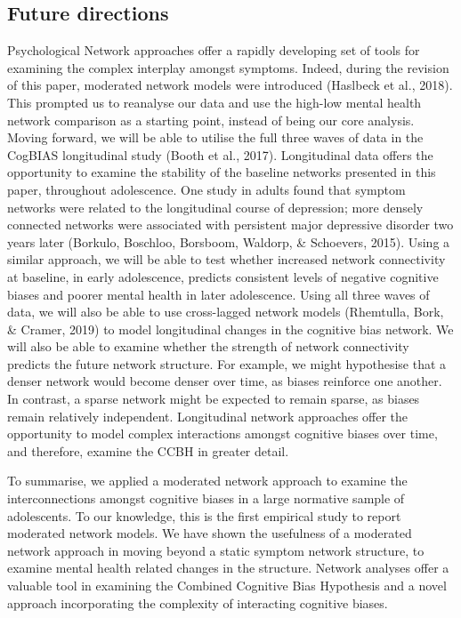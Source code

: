 \documentclass[man,floatsintext]{apa6}
\begin{document}
\hypertarget{future-directions}{%
\subsection{Future directions}\label{future-directions}}

Psychological Network approaches offer a rapidly developing set of tools for examining the complex interplay amongst symptoms. Indeed, during the revision of this paper, moderated network models were introduced (Haslbeck et al., 2018). This prompted us to reanalyse our data and use the high-low mental health network comparison as a starting point, instead of being our core analysis. Moving forward, we will be able to utilise the full three waves of data in the CogBIAS longitudinal study (Booth et al., 2017). Longitudinal data offers the opportunity to examine the stability of the baseline networks presented in this paper, throughout adolescence. One study in adults found that symptom networks were related to the longitudinal course of depression; more densely connected networks were associated with persistent major depressive disorder two years later (Borkulo, Boschloo, Borsboom, Waldorp, \& Schoevers, 2015). Using a similar approach, we will be able to test whether increased network connectivity at baseline, in early adolescence, predicts consistent levels of negative cognitive biases and poorer mental health in later adolescence. Using all three waves of data, we will also be able to use cross-lagged network models (Rhemtulla, Bork, \& Cramer, 2019) to model longitudinal changes in the cognitive bias network. We will also be able to examine whether the strength of network connectivity predicts the future network structure. For example, we might hypothesise that a denser network would become denser over time, as biases reinforce one another. In contrast, a sparse network might be expected to remain sparse, as biases remain relatively independent. Longitudinal network approaches offer the opportunity to model complex interactions amongst cognitive biases over time, and therefore, examine the CCBH in greater detail.

To summarise, we applied a moderated network approach to examine the interconnections amongst cognitive biases in a large normative sample of adolescents. To our knowledge, this is the first empirical study to report moderated network models. We have shown the usefulness of a moderated network approach in moving beyond a static symptom network structure, to examine mental health related changes in the structure. Network analyses offer a valuable tool in examining the Combined Cognitive Bias Hypothesis and a novel approach incorporating the complexity of interacting cognitive biases.
\end{document}
